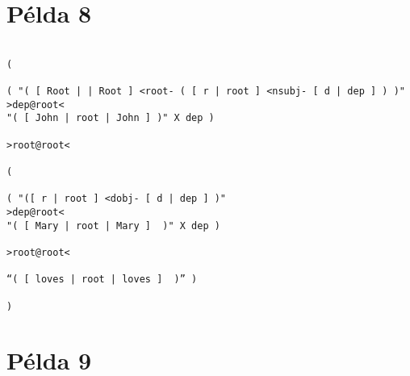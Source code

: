 \section{Példa 8}

\begin{verbatim}

( 

( "( [ Root | | Root ] <root- ( [ r | root ] <nsubj- [ d | dep ] ) )" 
>dep@root< 
"( [ John | root | John ] )" X dep ) 

>root@root<

( 

( "([ r | root ] <dobj- [ d | dep ] )" 
>dep@root< 
"( [ Mary | root | Mary ]  )" X	dep ) 

>root@root<

“( [ loves | root | loves ]  )” )

)
\end{verbatim}



\section{Példa 9}

